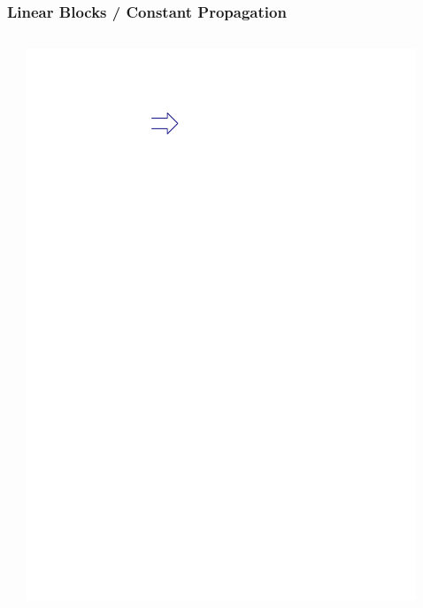 \documentclass[navbaroff,en]{sdqbeamer}
\begin{document}
\begin{frame}
    \frametitle{Linear Blocks / Constant Propagation}

	\begin{columns}
		\centering
		\begin{column}{0.15\textwidth}
			\centering
			\scalebox{0.14}{}
		\end{column}
		\begin{column}{0.05\textwidth}
			\centering
			\includegraphics[scale=0.7]{images/arrow.ipe.pdf}
		\end{column}
		\begin{column}{0.25\textwidth}
			\centering
			\scalebox{0.2}{}
		\end{column}
		\begin{column}{0.05\textwidth}
			\centering

\end{column}
\end{columns}
\end{frame}
\end{document}
